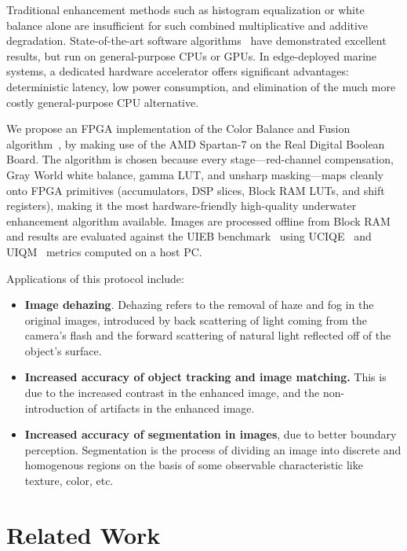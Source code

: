 \documentclass[10pt,twocolumn,letterpaper]{article}
\begin{document}
Traditional enhancement methods such as histogram equalization or white
balance alone are insufficient for such combined multiplicative and additive
degradation. State-of-the-art software algorithms~\cite{ancuti2018color,
peng2017underwater, galdran2015automatic} have demonstrated excellent results,
but run on general-purpose CPUs or GPUs. In edge-deployed marine systems,
a dedicated hardware accelerator offers significant advantages: deterministic
latency, low power consumption, and elimination of the much more costly general-purpose CPU alternative.

We propose an FPGA implementation of the Color Balance and Fusion
algorithm~\cite{ancuti2018color}, by making use of the AMD Spartan-7 on the
Real Digital Boolean Board. The algorithm is chosen because every
stage---red-channel compensation, Gray World white balance, gamma LUT, and
unsharp masking---maps cleanly onto FPGA primitives (accumulators, DSP
slices, Block RAM LUTs, and shift registers), making it the most
hardware-friendly high-quality underwater enhancement algorithm available.
Images are processed offline from Block RAM and results are evaluated against
the UIEB benchmark~\cite{li2020underwater} using UCIQE~\cite{yang2015uciqe}
and UIQM~\cite{panetta2016uiqm} metrics computed on a host PC.

Applications of this protocol include:
\begin{itemize}
    \item \textbf{Image dehazing}. Dehazing refers to the removal of haze and fog in the original images, introduced by back scattering of light coming from the camera's flash and the forward scattering of natural light reflected off of the object's surface. 
    \item \textbf{Increased accuracy of object tracking and image matching.} This is due to the increased contrast in the enhanced image, and the non-introduction of artifacts in the enhanced image.
    \item \textbf{Increased accuracy of segmentation in images}, due to better boundary perception. Segmentation is the process of dividing an image into discrete and homogenous regions on the basis of some observable characteristic like texture, color, etc. 
\end{itemize}


\section{Related Work}
\label{sec:related}
\end{document}
